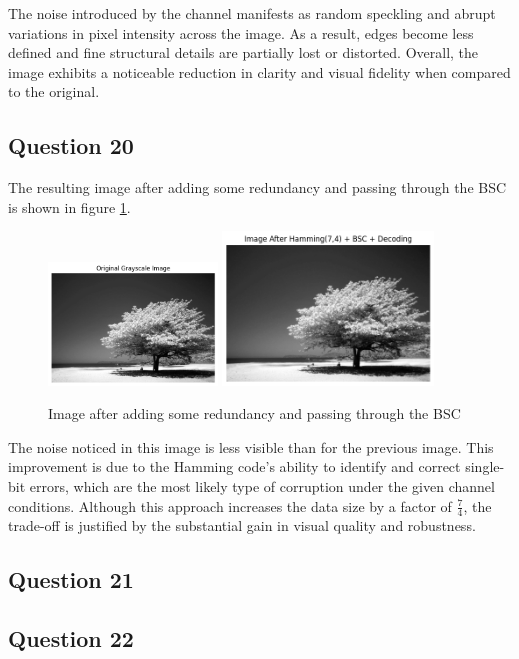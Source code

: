 \documentclass[]{template}
\begin{document}
    \noindent
    The noise introduced by the channel manifests as random speckling and abrupt variations in pixel intensity across the image. 
    As a result, edges become less defined and fine structural details are partially lost or distorted. 
    Overall, the image exhibits a noticeable reduction in clarity and visual fidelity when compared to the original.

    \subsection{Question 20}

    The resulting image after adding some redundancy and passing through the BSC is shown in figure \ref{fig:image_bsc_redundancy}.
    \begin{figure}[ht]
        \centering
        \includegraphics[width=0.4\textwidth]{Images/image.png}
        \includegraphics[width=0.5\textwidth]{Images/image_bsc_redundancy.png} 
        \caption{Image after adding some redundancy and passing through the BSC}\label{fig:image_bsc_redundancy}
    \end{figure}

    \noindent
    The noise noticed in this image is less visible than for the previous image.
    This improvement is due to the Hamming code's ability to identify and correct 
    single-bit errors, which are the most likely type of corruption under the given channel conditions. 
    Although this approach increases the data size by a factor of $\frac{7}{4}$, the trade-off is 
    justified by the substantial gain in visual quality and robustness.  

    \subsection{Question 21}

    \subsection{Question 22}
\end{document}
